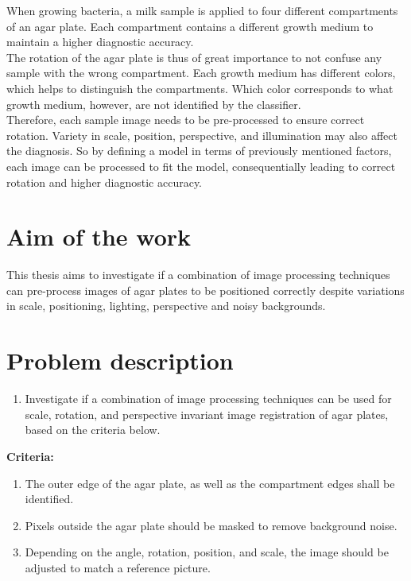 \noindent When growing bacteria, a milk sample is applied to four different compartments of an agar plate. Each compartment contains a different growth medium to maintain a higher diagnostic accuracy. \\

\noindent The rotation of the agar plate is thus of great importance to not confuse any sample with the wrong compartment. Each growth medium has different colors, which helps to distinguish the compartments. Which color corresponds to what growth medium, however, are not identified by the classifier.\\


\noindent Therefore, each sample image needs to be pre-processed to ensure correct rotation. Variety in scale, position, perspective, and illumination may also affect the diagnosis. So by defining a model in terms of previously mentioned factors, each image can be processed to fit the model, consequentially leading to correct rotation and higher diagnostic accuracy.

\section{Aim of the work}
This thesis aims to investigate if a combination of image processing techniques can pre-process images of agar plates to be positioned correctly despite variations in scale, positioning, lighting, perspective and noisy backgrounds. 

\section{Problem description}
\begin{enumerate}
    \item Investigate if a combination of image processing techniques can be used for scale, rotation, and perspective invariant image registration of agar plates, based on the criteria below. 
    
\end{enumerate}
\textbf{Criteria:} 
\begin{enumerate}
    \item The outer edge of the agar plate, as well as the compartment edges shall be identified. 
    \item Pixels outside the agar plate should be masked to remove background noise.
    \item Depending on the angle, rotation, position, and scale, the image should be adjusted to match a reference picture.
\end{enumerate}


